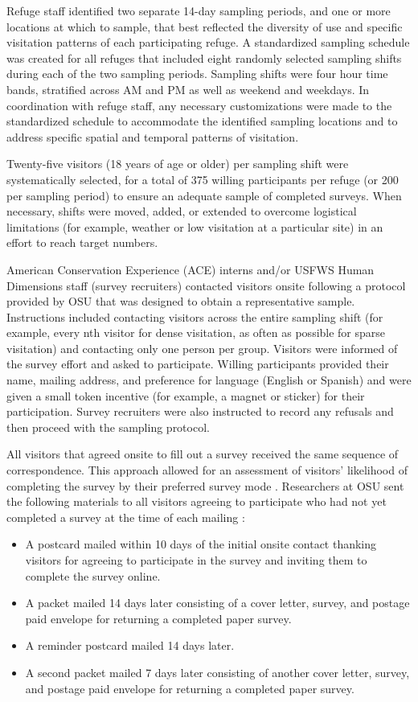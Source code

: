 \documentclass[]{book}
\providecommand{\tightlist}{%
  \setlength{\itemsep}{0pt}\setlength{\parskip}{0pt}}
\begin{document}
Refuge staff identified two separate 14-day sampling periods, and one or
more locations at which to sample, that best reflected the diversity of
use and specific visitation patterns of each participating refuge. A
standardized sampling schedule was created for all refuges that included
eight randomly selected sampling shifts during each of the two sampling
periods. Sampling shifts were four hour time bands, stratified across AM
and PM as well as weekend and weekdays. In coordination with refuge
staff, any necessary customizations were made to the standardized
schedule to accommodate the identified sampling locations and to address
specific spatial and temporal patterns of visitation.

Twenty-five visitors (18 years of age or older) per sampling shift were
systematically selected, for a total of 375 willing participants per
refuge (or 200 per sampling period) to ensure an adequate sample of
completed surveys. When necessary, shifts were moved, added, or extended
to overcome logistical limitations (for example, weather or low
visitation at a particular site) in an effort to reach target numbers.

American Conservation Experience (ACE) interns and/or USFWS Human
Dimensions staff (survey recruiters) contacted visitors onsite following
a protocol provided by OSU that was designed to obtain a representative
sample. Instructions included contacting visitors across the entire
sampling shift (for example, every nth visitor for dense visitation, as
often as possible for sparse visitation) and contacting only one person
per group. Visitors were informed of the survey effort and asked to
participate. Willing participants provided their name, mailing address,
and preference for language (English or Spanish) and were given a small
token incentive (for example, a magnet or sticker) for their
participation. Survey recruiters were also instructed to record any
refusals and then proceed with the sampling protocol.

All visitors that agreed onsite to fill out a survey received the same
sequence of correspondence. This approach allowed for an assessment of
visitors' likelihood of completing the survey by their preferred survey
mode \citep{sexton2011}. Researchers at OSU sent the following materials
to all visitors agreeing to participate who had not yet completed a
survey at the time of each mailing \citep{dillman2014}:

\begin{itemize}
\tightlist
\item
  A postcard mailed within 10 days of the initial onsite contact
  thanking visitors for agreeing to participate in the survey and
  inviting them to complete the survey online.
\item
  A packet mailed 14 days later consisting of a cover letter, survey,
  and postage paid envelope for returning a completed paper survey.
\item
  A reminder postcard mailed 14 days later.
\item
  A second packet mailed 7 days later consisting of another cover
  letter, survey, and postage paid envelope for returning a completed
  paper survey.
\end{itemize}
\end{document}
